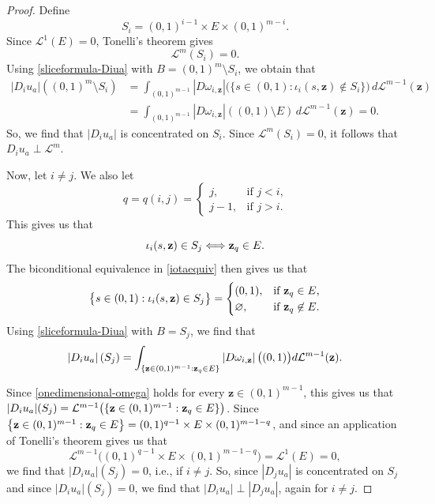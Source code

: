 \documentclass{publicadapt}
\begin{document}
\begin{proof}
Define
\begin{equation}\label{threeCartesian}
S_i=(0,1)^{i-1}\times E\times(0,1)^{m-i}.
\end{equation}
 Since \(\mathcal L^1(E)=0\), Tonelli's theorem gives
\begin{equation}\label{LmSi0}
\mathcal L^m(S_i)=0.
\end{equation}
 Using \eqref{sliceformula-Diua} with \(B=(0,1)^m\setminus S_i\), we obtain that 
$$ \begin{aligned}
|D_i u_a|((0,1)^m\setminus S_i)
&=
\int_{(0,1)^{m-1}}
|D\omega_{i,\mathbf z}|
\bigl(\{s\in(0,1):\iota_i(s,\mathbf z)\notin S_i\}\bigr)
\,d\mathcal L^{m-1}(\mathbf z) \\[4pt]
&=
\int_{(0,1)^{m-1}}
|D\omega_{i,\mathbf z}|((0,1)\setminus E)
\,d\mathcal L^{m-1}(\mathbf z)
=
0.
\end{aligned}
$$ So, we find that $|D_i u_a|$ is concentrated on $S_i$. Since \(\mathcal L^m(S_i)=0\), it follows that $ D_i u_a\perp\mathcal L^m$. 

 Now, let $i \neq j$. We also let $$ q = q(i, j) = \begin{cases} 
 j, & \text{if $j < i$,} \\
 j - 1, & \text{if $j > i$.} 
 \end{cases} $$
 This gives us that 
\begin{equation}\label{iotaequiv} 
 \iota_{i}(s, \text{{\bf z}}) \in S_{j} \Longleftrightarrow \text{{\bf z}}_{q} \in E. 
\end{equation} 
 The biconditional equivalence in \eqref{iotaequiv} then gives us that $$ \big\{ s \in (0, 1) : \iota_{i}(s, \text{{\bf z}}) \in S_{j} \big\} = \begin{cases} 
 (0, 1), & \text{if $\text{{\bf z}}_{q} \in E$,} \\
 \varnothing, & \text{if $\text{{\bf z}}_{q} \not\in E$.} 
 \end{cases} $$
 Using \eqref{sliceformula-Diua} with \(B=S_j\), we find that $$\left| D_{i}u_{a} \right|(S_{j}) = \int_{ \{ \text{{\bf z}} \in (0, 1)^{m-1} : \text{{\bf z}}_{q} \in E \} } \left| D \omega_{i, 
 \text{{\bf z}}} \right|\big( (0, 1) \big) d\mathcal{L}^{m-1}(\text{{\bf z}}).$$ 

 Since \eqref{onedimensional-omega} holds for every $\mathbf z\in(0,1)^{m-1}$, this gives us that $|D_{i} u_{a}|(S_{j}) = \mathcal{L}^{m-1}\big( \{ \text{{\bf z}} \in (0, 1)^{m - 
 1} : \text{{\bf z}}_{q} \in E \} \big)$. Since $ \big\{ \text{{\bf z}} \in (0, 1)^{m-1} : \text{{\bf z}}_{q} \in E \big\} = (0, 1)^{q-1} \times E \times (0, 1)^{m-1-q}$, and since an application 
 of Tonelli's theorem gives us that $$\mathcal{L}^{m-1}\big( (0, 1)^{q-1} \times E \times (0, 1)^{m-1-q} \big)
 = \mathcal{L}^{1}(E) = 0,$$ 
 we find that $\left| D_{i}u_a \right|(S_{j}) = 0$, i.e., if $i \neq j$. 
 So, since $\left| D_{j} u_a \right|$ is concentrated on $S_{j}$
 and since $\left| D_{i} u_{a} \right|(S_{j}) = 0$, 
 we find that $\left| D_{i} u_{a} \right| \perp \left| D_{j} u_{a} \right|$, again for $i \neq j$. 


\end{proof}
\end{document}
